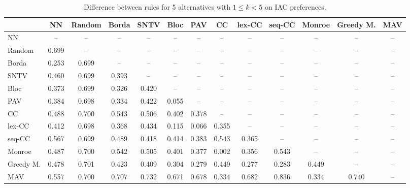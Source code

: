 
\begin{table*}[htbp]
\centering
\begin{tabular}{lcccccccccccc}
\toprule
 & NN & Random & Borda & SNTV & Bloc & PAV & CC & lex-CC & seq-CC & Monroe & Greedy M. & MAV \\
\midrule
NN & -- & -- & -- & -- & -- & -- & -- & -- & -- & -- & -- & -- \\
Random & \cellcolor{blue!69} 0.699 & -- & -- & -- & -- & -- & -- & -- & -- & -- & -- & -- \\
Borda & \cellcolor{blue!25} 0.253 & \cellcolor{blue!69} 0.699 & -- & -- & -- & -- & -- & -- & -- & -- & -- & -- \\
SNTV & \cellcolor{blue!46} 0.460 & \cellcolor{blue!69} 0.699 & \cellcolor{blue!39} 0.393 & -- & -- & -- & -- & -- & -- & -- & -- & -- \\
Bloc & \cellcolor{blue!37} 0.373 & \cellcolor{blue!69} 0.699 & \cellcolor{blue!32} 0.326 & \cellcolor{blue!42} 0.420 & -- & -- & -- & -- & -- & -- & -- & -- \\
PAV & \cellcolor{blue!38} 0.384 & \cellcolor{blue!69} 0.698 & \cellcolor{blue!33} 0.334 & \cellcolor{blue!42} 0.422 & \cellcolor{blue!5} 0.055 & -- & -- & -- & -- & -- & -- & -- \\
CC & \cellcolor{blue!48} 0.488 & \cellcolor{blue!70} 0.700 & \cellcolor{blue!54} 0.543 & \cellcolor{blue!50} 0.506 & \cellcolor{blue!40} 0.402 & \cellcolor{blue!37} 0.378 & -- & -- & -- & -- & -- & -- \\
lex-CC & \cellcolor{blue!41} 0.412 & \cellcolor{blue!69} 0.698 & \cellcolor{blue!36} 0.368 & \cellcolor{blue!43} 0.434 & \cellcolor{blue!11} 0.115 & \cellcolor{blue!6} 0.066 & \cellcolor{blue!35} 0.355 & -- & -- & -- & -- & -- \\
seq-CC & \cellcolor{blue!56} 0.567 & \cellcolor{blue!69} 0.699 & \cellcolor{blue!48} 0.489 & \cellcolor{blue!41} 0.418 & \cellcolor{blue!41} 0.414 & \cellcolor{blue!38} 0.383 & \cellcolor{blue!54} 0.543 & \cellcolor{blue!36} 0.365 & -- & -- & -- & -- \\
Monroe & \cellcolor{blue!48} 0.487 & \cellcolor{blue!70} 0.700 & \cellcolor{blue!54} 0.542 & \cellcolor{blue!50} 0.505 & \cellcolor{blue!40} 0.401 & \cellcolor{blue!37} 0.377 & \cellcolor{blue!0} 0.002 & \cellcolor{blue!35} 0.356 & \cellcolor{blue!54} 0.543 & -- & -- & -- \\
Greedy M. & \cellcolor{blue!47} 0.478 & \cellcolor{blue!70} 0.701 & \cellcolor{blue!42} 0.423 & \cellcolor{blue!40} 0.409 & \cellcolor{blue!30} 0.304 & \cellcolor{blue!27} 0.279 & \cellcolor{blue!44} 0.449 & \cellcolor{blue!27} 0.277 & \cellcolor{blue!28} 0.283 & \cellcolor{blue!44} 0.449 & -- & -- \\
MAV & \cellcolor{blue!55} 0.557 & \cellcolor{blue!70} 0.700 & \cellcolor{blue!70} 0.707 & \cellcolor{blue!73} 0.732 & \cellcolor{blue!67} 0.671 & \cellcolor{blue!67} 0.678 & \cellcolor{blue!33} 0.334 & \cellcolor{blue!68} 0.682 & \cellcolor{blue!83} 0.836 & \cellcolor{blue!33} 0.334 & \cellcolor{blue!74} 0.740 & -- \\
\bottomrule
\end{tabular}

\caption{Difference between rules for 5 alternatives with $1 \leq k < 5$ on IAC preferences.}
\label{tab:rule_distance_heatmap-m=[5]-pref_dist=IAC}
\end{table*}
    